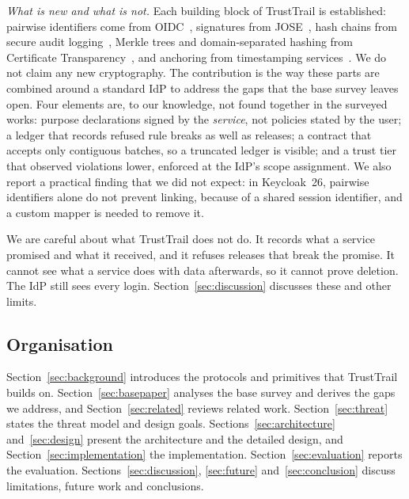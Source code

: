 \emph{What is new and what is not.} Each building block of TrustTrail is established: pairwise identifiers come from OIDC~\cite{oidccore}, signatures from JOSE~\cite{rfc7515}, hash chains from secure audit logging~\cite{schneier1999secure}, Merkle trees and domain-separated hashing from Certificate Transparency~\cite{rfc6962}, and anchoring from timestamping services~\cite{todd2016opentimestamps}. We do not claim any new cryptography. The contribution is the way these parts are combined around a standard IdP to address the gaps that the base survey leaves open. Four elements are, to our knowledge, not found together in the surveyed works: purpose declarations signed by the \emph{service}, not policies stated by the user; a ledger that records refused rule breaks as well as releases; a contract that accepts only contiguous batches, so a truncated ledger is visible; and a trust tier that observed violations lower, enforced at the IdP's scope assignment. We also report a practical finding that we did not expect: in Keycloak~26, pairwise identifiers alone do not prevent linking, because of a shared session identifier, and a custom mapper is needed to remove it.

We are careful about what TrustTrail does not do. It records what a service promised and what it received, and it refuses releases that break the promise. It cannot see what a service does with data afterwards, so it cannot prove deletion. The IdP still sees every login. Section~\ref{sec:discussion} discusses these and other limits.

\subsection{Organisation}
Section~\ref{sec:background} introduces the protocols and primitives that TrustTrail builds on. Section~\ref{sec:basepaper} analyses the base survey and derives the gaps we address, and Section~\ref{sec:related} reviews related work. Section~\ref{sec:threat} states the threat model and design goals. Sections~\ref{sec:architecture} and~\ref{sec:design} present the architecture and the detailed design, and Section~\ref{sec:implementation} the implementation. Section~\ref{sec:evaluation} reports the evaluation. Sections~\ref{sec:discussion}, \ref{sec:future} and~\ref{sec:conclusion} discuss limitations, future work and conclusions.
